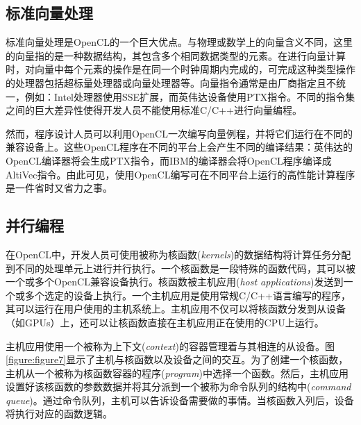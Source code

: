 \subsection{标准向量处理}

标准向量处理是OpenCL的一个巨大优点。与物理或数学上的向量含义不同，这里的向量指的是一种数据结构，其包含多个相同数据类型的元素。在进行向量计算时，对向量中每个元素的操作是在同一个时钟周期内完成的，可完成这种类型操作的处理器包括超标量处理器或向量处理器等。向量指令通常是由厂商指定且不统一，例如：Intel处理器使用SSE扩展，而英伟达设备使用PTX指令。不同的指令集之间的巨大差异性使得开发人员不能使用标准C/C++进行向量编程。

然而，程序设计人员可以利用OpenCL一次编写向量例程，并将它们运行在不同的兼容设备上。这些OpenCL程序在不同的平台上会产生不同的编译结果：英伟达的OpenCL编译器将会生成PTX指令，而IBM的编译器会将OpenCL程序编译成AltiVec指令。由此可见，使用OpenCL编写可在不同平台上运行的高性能计算程序是一件省时又省力之事。

\subsection{并行编程}

在OpenCL中，开发人员可使用被称为核函数(\emph{kernels})的数据结构将计算任务分配到不同的处理单元上进行并行执行。一个核函数是一段特殊的函数代码，其可以被一个或多个OpenCL兼容设备执行。核函数被主机应用(\emph{host applications})发送到一个或多个选定的设备上执行。一个主机应用是使用常规C/C++语言编写的程序，其可以运行在用户使用的主机系统上。主机应用不仅可以将核函数分发到从设备（如GPUs）上，还可以让核函数直接在主机应用正在使用的CPU上运行。

主机应用使用一个被称为上下文(\emph{context})的容器管理着与其相连的从设备。图\ref{figure:figure7}显示了主机与核函数以及设备之间的交互。为了创建一个核函数，主机从一个被称为核函数容器的程序(\emph{program})中选择一个函数。然后，主机应用设置好该核函数的参数数据并将其分派到一个被称为命令队列的结构中(\emph{command queue})。通过命令队列，主机可以告诉设备需要做的事情。当核函数入列后，设备将执行对应的函数逻辑。

